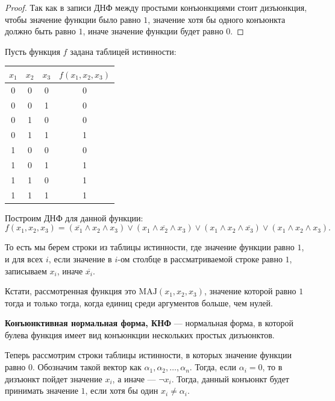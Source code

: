 \documentclass[a4paper]{article}
\theoremstyle{named}
\begin{document}
\begin{colloq}
\begin{proof}
            Так как в записи ДНФ между простыми конъюнкциями стоит дизъюнкция, чтобы значение функции было равно $1$, значение хотя бы одного конъюнкта должно быть равно $1$, иначе значение функции будет равно $0$.
        \end{proof}

        Пусть функция $f$ задана таблицей истинности:
        \begin{table}[h]
            \centering
            \begin{tabular}{|c|c|c|c|}
                \hline
                $x_1$ & $x_2$ & $x_3$ & $f(x_1, x_2, x_3)$ \\
                \hline
                0 & 0 & 0 & 0 \\\hline
                0 & 0 & 1 & 0 \\\hline
                0 & 1 & 0 & 0 \\\hline
                0 & 1 & 1 & 1 \\\hline
                1 & 0 & 0 & 0 \\\hline
                1 & 0 & 1 & 1 \\\hline
                1 & 1 & 0 & 1 \\\hline
                1 & 1 & 1 & 1 \\
                \hline
            \end{tabular}
        \end{table}

        Построим ДНФ для данной функции:
        \begin{equation*}
            f(x_1, x_2, x_3) = (\overline{x_1} \land x_2 \land x_3) \lor (x_1 \land \overline{x_2} \land x_3) \lor (x_1 \land x_2 \land \overline{x_3}) \lor (x_1 \land x_2 \land x_3).
        \end{equation*}

        То есть мы берем строки из таблицы истинности, где значение функции равно $1$, и для всех $i$, если значение в $i$-ом столбце в рассматриваемой строке равно $1$, записываем $x_i$, иначе $\overline{x_i}$. 

        Кстати, рассмотренная функция это $\text{MAJ}(x_1, x_2, x_3)$, значение которой равно $1$ тогда и только тогда, когда единиц среди аргументов больше, чем нулей.

        \textbf{Конъюнктивная нормальная форма, КНФ} --- нормальная форма, в которой булева функция имеет вид конъюнкции нескольких простых дизъюнктов.

        Теперь рассмотрим строки таблицы истинности, в которых значение функции равно $0$. Обозначим такой вектор как $\alpha_1, \alpha_2, \dots, \alpha_n$. Тогда, если $\alpha_i = 0$, то в дизъюнкт пойдет значение $x_i$, а иначе --- $\neg x_i$. Тогда, данный конъюнкт будет принимать значение $1$, если хотя бы один $x_i \neq \alpha_i$. 


\end{colloq}
\end{document}
